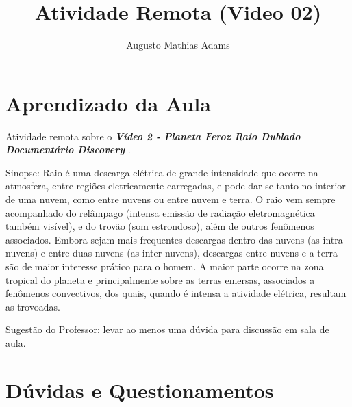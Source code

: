 \documentclass[a4paper, 12pt, onecolumn,singlespacing]{article}
\title{Atividade Remota (Video 02)}
\author[1]{Augusto Mathias Adams}
\affil[1]{augusto.adams@ufpr.br}
\begin{document}
	
	\maketitle
	
	\section{Aprendizado da Aula}
	
	Atividade remota sobre o \textbf{\textit{Vídeo 2 - Planeta Feroz Raio Dublado Documentário Discovery }}.
	
	Sinopse: Raio é uma descarga elétrica de grande intensidade que ocorre na atmosfera, entre regiões eletricamente carregadas, e pode dar-se tanto no interior de uma nuvem, como entre nuvens ou entre nuvem e terra. O raio vem sempre acompanhado do relâmpago (intensa emissão de radiação eletromagnética também visível), e do trovão (som estrondoso), além de outros fenômenos associados. Embora sejam mais frequentes descargas dentro das nuvens (as intra-nuvens) e entre duas nuvens (as inter-nuvens), descargas entre nuvens e a terra são de maior interesse prático para o homem. A maior parte ocorre na zona tropical do planeta e principalmente sobre as terras emersas, associados a fenômenos convectivos, dos quais, quando é intensa a atividade elétrica, resultam as trovoadas.
	
	Sugestão do Professor: levar ao menos uma dúvida para discussão em sala de aula.
	
	\section{Dúvidas e Questionamentos}
	
\end{document}
